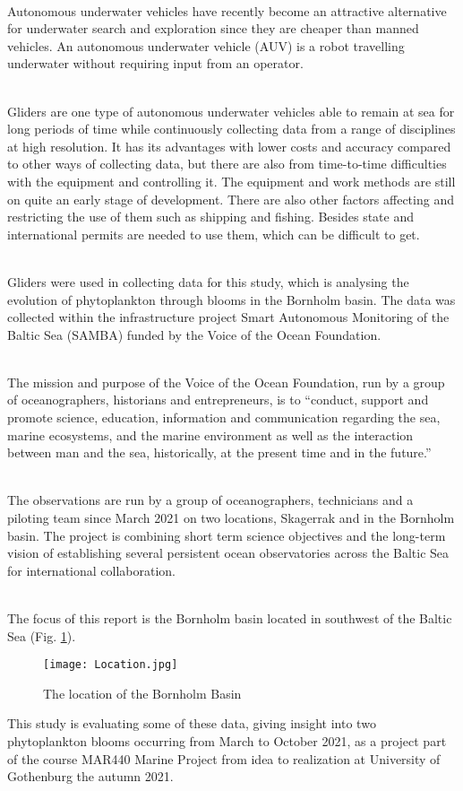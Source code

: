 \documentclass[../Main.tex]{subfiles}
\begin{document}
\\
Autonomous underwater vehicles have recently become an attractive alternative for underwater search and exploration since they are cheaper than manned vehicles. 
An autonomous underwater vehicle (AUV) is a robot travelling underwater without requiring input from an operator.

\\
Gliders are one type of autonomous underwater vehicles able to remain at sea for long periods of time while continuously collecting data from a range of disciplines at high resolution. 
It has its advantages with lower costs and accuracy compared to other ways of collecting data, but there are also from time-to-time difficulties with the equipment and controlling it. 
The equipment and work methods are still on quite an early stage of development. 
There are also other factors affecting and restricting the use of them such as shipping and fishing. 
Besides state and international permits are needed to use them, which can be difficult to get. 

\\
Gliders were used in collecting data for this study, which is analysing the evolution of phytoplankton through blooms in the Bornholm basin. 
The data was collected within the infrastructure project Smart Autonomous Monitoring of the Baltic Sea (SAMBA) funded by the Voice of the Ocean Foundation.

\\ 
The mission and purpose of the Voice of the Ocean Foundation, run by a group of oceanographers, historians and entrepreneurs, is to “conduct, support and promote science, education, information and communication regarding the sea, marine ecosystems, and the marine environment as well as the interaction between man and the sea, historically, at the present time and in the future.”\supercite{VOTO2021} 

\\
The observations are run by a group of oceanographers, technicians and a piloting team since March 2021 on two locations, Skagerrak and in the Bornholm basin. 
The project is combining short term science objectives and the long-term vision of establishing several persistent ocean observatories across the Baltic Sea for international collaboration.

\\
The focus of this report is the Bornholm basin located in southwest of the Baltic Sea (Fig. \ref{fig:loc}).
\begin{figure}[H]
\texttt{[image: Location.jpg]}
\caption{The location of the Bornholm Basin}
\label{fig:loc}
\end{figure}
This study is evaluating some of these data, giving insight into two phytoplankton blooms occurring from March to October 2021, as a project part of the course MAR440 Marine Project from idea to realization at University of Gothenburg the autumn 2021.
\end{document}
